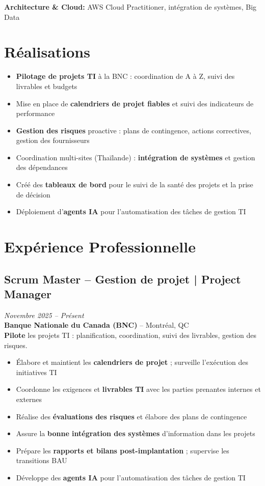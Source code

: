 \documentclass[11pt,a4paper]{article}
\begin{document}
\textbf{Architecture \& Cloud:} AWS Cloud Practitioner, intégration de systèmes, Big Data

\vspace{6pt}

\section*{Réalisations}
\begin{itemize}
    \item \textbf{Pilotage de projets TI} à la BNC : coordination de A à Z, suivi des livrables et budgets
    \item Mise en place de \textbf{calendriers de projet fiables} et suivi des indicateurs de performance
    \item \textbf{Gestion des risques} proactive : plans de contingence, actions correctives, gestion des fournisseurs
    \item Coordination multi-sites (Thaïlande) : \textbf{intégration de systèmes} et gestion des dépendances
    \item Créé des \textbf{tableaux de bord} pour le suivi de la santé des projets et la prise de décision
    \item Déploiement d'\textbf{agents IA} pour l'automatisation des tâches de gestion TI
\end{itemize}

\section*{Expérience Professionnelle}

\subsection*{Scrum Master -- Gestion de projet | Project Manager} \hfill \textit{Novembre 2025 -- Présent}\\
\textbf{Banque Nationale du Canada (BNC)} -- Montréal, QC\\
\textbf{Pilote} les projets TI : planification, coordination, suivi des livrables, gestion des risques.
\begin{itemize}
    \item Élabore et maintient les \textbf{calendriers de projet} ; surveille l'exécution des initiatives TI
    \item Coordonne les exigences et \textbf{livrables TI} avec les parties prenantes internes et externes
    \item Réalise des \textbf{évaluations des risques} et élabore des plans de contingence
    \item Assure la \textbf{bonne intégration des systèmes} d'information dans les projets
    \item Prépare les \textbf{rapports et bilans post-implantation} ; supervise les transitions BAU
    \item Développe des \textbf{agents IA} pour l'automatisation des tâches de gestion TI
\end{itemize}
\end{document}
